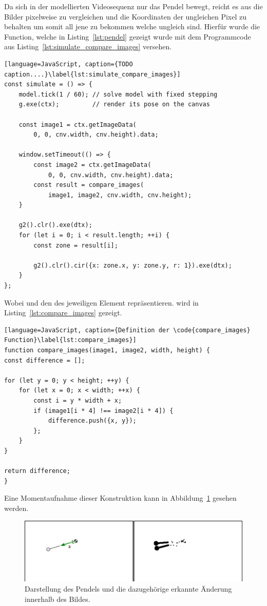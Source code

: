Da sich in der modellierten Videosequenz nur das Pendel bewegt, reicht es aus die Bilder pixelweise zu vergleichen und die Koordinaten der ungleichen Pixel zu behalten um somit all jene zu bekommen welche ungleich sind.
Hierfür wurde die  Function, welche in Listing~\ref{lst:pendel} gezeigt wurde mit dem Programmcode aus Listing~\ref{lst:simulate_compare_images} versehen.

\begin{lstlisting}[language=JavaScript, caption={TODO caption....}\label{lst:simulate_compare_images}]
const simulate = () => {
    model.tick(1 / 60); // solve model with fixed stepping
    g.exe(ctx);         // render its pose on the canvas

    const image1 = ctx.getImageData(
        0, 0, cnv.width, cnv.height).data;

    window.setTimeout(() => {
        const image2 = ctx.getImageData(
            0, 0, cnv.width, cnv.height).data;
        const result = compare_images(
            image1, image2, cnv.width, cnv.height);
    }

    g2().clr().exe(dtx);
    for (let i = 0; i < result.length; ++i) {
        const zone = result[i];

        g2().clr().cir({x: zone.x, y: zone.y, r: 1}).exe(dtx);
    }
};
\end{lstlisting}

Wobei  und  den  des jeweiligen  Element repräsentieren.
 wird in Listing~\ref{lst:compare_images} gezeigt.

\begin{lstlisting}[language=JavaScript, caption={Definition der \code{compare_images} Function}\label{lst:compare_images}]
function compare_images(image1, image2, width, height) {
const difference = [];

for (let y = 0; y < height; ++y) {
    for (let x = 0; x < width; ++x) {
        const i = y * width + x;
        if (image1[i * 4] !== image2[i * 4]) {
            difference.push({x, y});
        };
    }
}

return difference;
}
\end{lstlisting}

Eine Momentaufnahme dieser Konstruktion kann in Abbildung~\ref{fig:compare_images} gesehen werden.

\begin{figure}[htb]
	\includegraphics[width=\textwidth]{gfx/compare_images_1.png}
	\caption{Darstellung des Pendels und die dazugehörige erkannte Änderung innerhalb des Bildes.}
	\label{fig:compare_images}
\end{figure}

